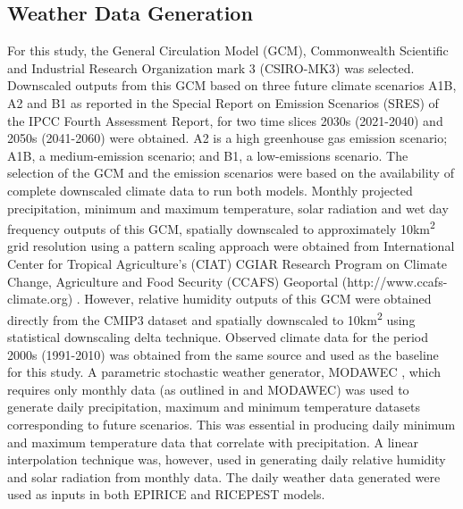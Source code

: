 \documentclass[preprint,review,12pt]{elsarticle}
\begin{document}
    \subsection{Weather Data Generation}
    For this study, the General Circulation Model (GCM), Commonwealth Scientific and Industrial Research Organization mark 3 (CSIRO-MK3) was selected. Downscaled outputs from this GCM based on three future climate scenarios A1B, A2 and B1 as reported in the Special Report on Emission Scenarios (SRES) of the IPCC Fourth Assessment Report, for two time slices 2030s (2021-2040) and 2050s (2041-2060) were obtained. A2 is a high greenhouse gas emission scenario; A1B, a medium-emission scenario; and B1, a low-emissions scenario. The selection of the GCM and the emission scenarios were based on the availability of complete downscaled climate data to run both models. Monthly projected precipitation, minimum and maximum temperature, solar radiation and wet day frequency outputs of this GCM, spatially downscaled to approximately 10km\textsuperscript{2} grid resolution using a pattern scaling approach were obtained from International Center for Tropical Agriculture's (CIAT) CGIAR Research Program on Climate Change, Agriculture and Food Security (CCAFS) Geoportal (http://www.ccafs-climate.org) \cite{Jones2009}. However, relative humidity outputs of this GCM were obtained directly from the CMIP3 dataset and spatially downscaled to 10km\textsuperscript{2} using statistical downscaling delta technique. Observed climate data for the period 2000s (1991-2010) was obtained from the same source and used as the baseline for this study. A parametric stochastic weather generator, MODAWEC \cite{Liu2009}, which requires only monthly data (as outlined in \citet{Geng1986} and MODAWEC) was used to generate daily precipitation, maximum and minimum temperature datasets corresponding to future scenarios. This was essential in producing daily minimum and maximum temperature data that correlate with precipitation. A linear interpolation technique was, however, used in generating daily relative humidity and solar radiation from monthly data. The daily weather data generated were used as inputs in both EPIRICE and RICEPEST models.
    
\end{document}
